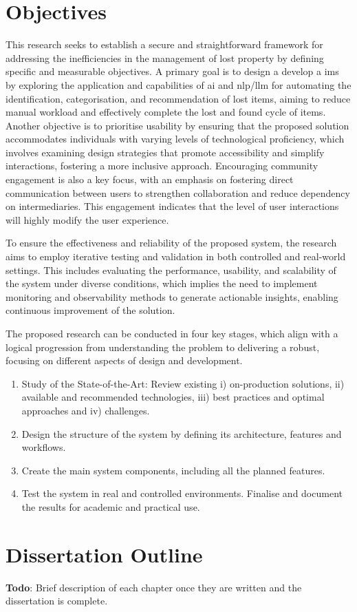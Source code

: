 \section{Objectives}

This research seeks to establish a secure and straightforward framework for addressing the inefficiencies in the management of lost property by defining specific and measurable objectives.
A primary goal is to design a develop a \ac{ims} by exploring the application and capabilities of \ac{ai} and \ac{nlp}/\ac{llm} for automating the identification, categorisation, and recommendation of lost items, aiming to reduce manual workload and effectively complete the lost and found cycle of items. %
Another objective is to prioritise usability by ensuring that the proposed solution accommodates individuals with varying levels of technological proficiency, which involves examining design strategies that promote accessibility and simplify interactions, fostering a more inclusive approach.
Encouraging community engagement is also a key focus, with an emphasis on fostering direct communication between users to strengthen collaboration and reduce dependency on intermediaries.
This engagement indicates that the level of user interactions will highly modify the user experience.

To ensure the effectiveness and reliability of the proposed system, the research aims to employ iterative testing and validation in both controlled and real-world settings.
This includes evaluating the performance, usability, and scalability of the system under diverse conditions, which implies the need to implement monitoring and observability methods to generate actionable insights, enabling continuous improvement of the solution.

The proposed research can be conducted in four key stages, which align with a logical progression from understanding the problem to delivering a robust, focusing on different aspects of design and development.

\begin{enumerate}
    \item Study of the State-of-the-Art: Review existing i) on-production solutions, ii) available and recommended technologies, iii) best practices and optimal approaches and iv) challenges.
    \item Design the structure of the system by defining its architecture, features and workflows.
    \item Create the main system components, including all the planned features.
    \item Test the system in real and controlled environments.
Finalise and document the results for academic and practical use.
\end{enumerate}

\section{Dissertation Outline}

\textbf{Todo}: Brief description of each chapter once they are written and the dissertation is complete.


